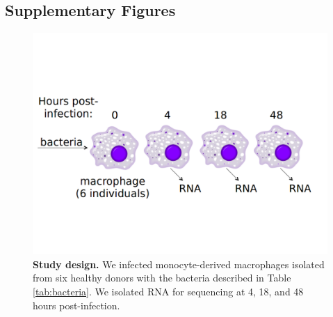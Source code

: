 \clearpage
\subsection{Supplementary Figures}\label{supplementary-figures}

\begin{figure}[htbp]
\centering
\includegraphics[width=5in]{img/ch02/fig-S01-study-design.png}
\caption[Study design.]{\textbf{Study design.} We infected
  monocyte-derived macrophages isolated from six healthy donors with
  the bacteria described in Table \ref{tab:bacteria}. We isolated RNA
  for sequencing at 4, 18, and 48 hours post-infection.}
\label{fig:study-design}
\end{figure}

